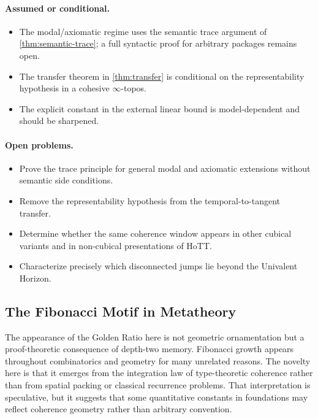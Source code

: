 \documentclass[11pt,a4paper]{article}
\theoremstyle{plain}
\theoremstyle{definition}
\theoremstyle{remark}
\begin{document}
\paragraph{Assumed or conditional.}
\begin{itemize}[nosep]
    \item The modal/axiomatic regime uses the semantic trace argument of \cref{thm:semantic-trace}; a full syntactic proof for arbitrary packages remains open.
    \item The transfer theorem in \cref{thm:transfer} is conditional on the representability hypothesis in a cohesive $\infty$-topos.
    \item The explicit constant in the external linear bound is model-dependent and should be sharpened.
\end{itemize}

\paragraph{Open problems.}
\begin{itemize}[nosep]
    \item Prove the trace principle for general modal and axiomatic extensions without semantic side conditions.
    \item Remove the representability hypothesis from the temporal-to-tangent transfer.
    \item Determine whether the same coherence window appears in other cubical variants and in non-cubical presentations of HoTT.
    \item Characterize precisely which disconnected jumps lie beyond the Univalent Horizon.
\end{itemize}

\subsection{The Fibonacci Motif in Metatheory}

The appearance of the Golden Ratio here is not geometric ornamentation but a proof-theoretic consequence of depth-two memory.  Fibonacci growth appears throughout combinatorics and geometry for many unrelated reasons.  The novelty here is that it emerges from the integration law of type-theoretic coherence rather than from spatial packing or classical recurrence problems.  That interpretation is speculative, but it suggests that some quantitative constants in foundations may reflect coherence geometry rather than arbitrary convention.
\end{document}
